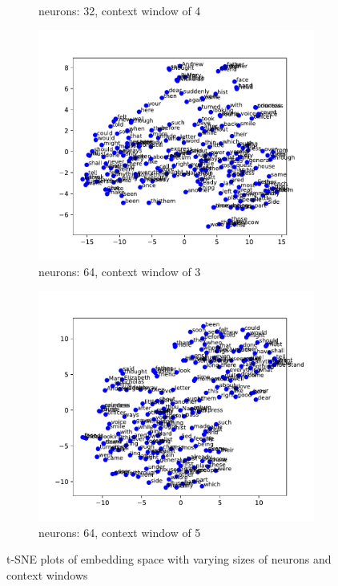 \documentclass[12pt]{article} \usepackage{COSC420style} \usepackage{soul}
\begin{document}
\begin{figure}[htbp]
\begin{subfigure}[b]{0.45\textwidth}
		\caption{neurons: 32, context window of 4}
		\label{fig:32_4}
	\end{subfigure}
	\newline %
	\begin{subfigure}[b]{0.45\textwidth}
		\includegraphics[width=\textwidth]{./figures/dim_64_ctx_3_embedding.pdf}
		\caption{neurons: 64, context window of 3}
		\label{fig:64_3}
	\end{subfigure}
	\begin{subfigure}[b]{0.45\textwidth}
		\includegraphics[width=\textwidth]{./figures/dim_64_ctx_5_embedding.pdf}
		\caption{neurons: 64, context window of 5}
		\label{fig:64_5}
	\end{subfigure}
	\caption{t-SNE plots of embedding space with varying sizes of neurons and context
		windows}
	\label{fig:small_embeddings}
\end{figure}
\end{document}
